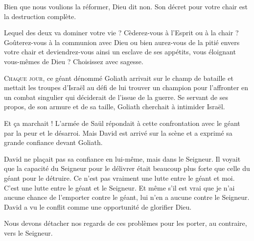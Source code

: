 
Bien que nous voulions la réformer, Dieu dit non.
 Son décret pour votre chair est la destruction complète.

Lequel des deux va dominer votre vie ?
 Cèderez-vous à l'Esprit ou à la chair ?
 Goûterez-vous à la communion avec Dieu ou bien aurez-vous
 de la pitié envers votre chair et deviendrez-vous ainsi
 un esclave de ses appétits, vous éloignant vous-mêmes de Dieu ?
 Choisissez avec sagesse. 

\dvrule






\lettrine{C}{haque jour}, ce géant dénommé Goliath arrivait
 sur le champ de bataille et mettait les troupes d'Israël
 au défi de lui trouver un champion pour l'affronter
 en un combat singulier qui déciderait de l'issue de la guerre.
 Se servant de ses propos, de son armure et de sa taille,
 Goliath cherchait à intimider Israël. 

Et \c{c}a marchait ! L'armée de Saül répondait à cette confrontation
 avec le géant par la peur et le désarroi.
 Mais David est arrivé sur la scène et a exprimé
 sa grande confiance devant Goliath.

David ne pla\c{c}ait pas sa confiance en lui-même, mais dans le Seigneur.
 Il voyait que la capacité du Seigneur pour le délivrer était
 beaucoup plus forte que celle du géant pour le détruire.
 \Og Ce n'est pas vraiment une lutte entre le géant et moi.
 C'est une lutte entre le géant et le Seigneur.
 Et même s'il est vrai que je n'ai aucune chance de l'emporter contre le géant,
 lui n'en a aucune contre le Seigneur. \Fg{}
 David a vu le conflit comme une opportunité de glorifier Dieu.


Nous devons détacher nos regards de ces problèmes pour les porter,
 au contraire, vers le Seigneur.

